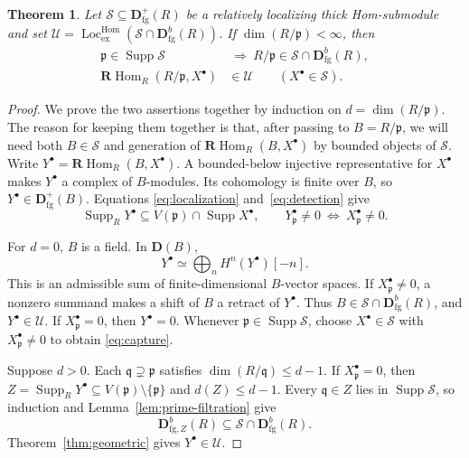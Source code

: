 \documentclass[11pt]{amsart}
\numberwithin{equation}{section}
\newtheorem{theorem}{Theorem}[section]
\theoremstyle{definition}
\theoremstyle{remark}
\DeclareMathOperator{\Supp}{Supp}
\DeclareMathOperator{\Loc}{Loc}
\DeclareMathOperator{\Hom}{Hom}
\newcommand{\RHom}{\mathbf R\!\Hom}
\newcommand{\D}{\mathbf D}
\newcommand{\fg}{\mathrm{fg}}
\newcommand{\Lhom}{\Loc_{\mathrm{ex}}^{\Hom}}
\newcommand{\p}{\mathfrak p}
\newcommand{\q}{\mathfrak q}
\begin{document}
\begin{theorem}\label{thm:coheight}
Let $\mathcal S\subseteq\D^+_{\fg}(R)$ be a relatively localizing thick
Hom-submodule and set
$\mathcal U=\Lhom(\mathcal S\cap\D^b_{\fg}(R))$. If $\dim(R/\p)<\infty$, then
\begin{align}
 \p\in\Supp\mathcal S&\ \Longrightarrow\ R/\p\in\mathcal S\cap\D^b_{\fg}(R),
 \label{eq:capture}\\
 \RHom_R(R/\p,X^{\bullet})&\in\mathcal U\qquad(X^{\bullet}\in\mathcal S).
 \label{eq:coinduce}
\end{align}
\end{theorem}
\begin{proof}
We prove the two assertions together by induction on
$d=\dim(R/\p)$. The reason for keeping them together is that, after
passing to $B=R/\p$, we will need both $B\in\mathcal S$ and generation
of $\RHom_R(B,X^{\bullet})$ by bounded objects of $\mathcal S$.
Write $Y^{\bullet}=\RHom_R(B,X^{\bullet})$. A bounded-below injective
representative for $X^{\bullet}$ makes $Y^{\bullet}$ a complex of $B$-modules. Its
cohomology is finite over $B$, so $Y^{\bullet}\in\D^+_{\fg}(B)$. Equations
\eqref{eq:localization} and~\eqref{eq:detection} give
\begin{equation}\label{eq:Ysupport}
 \Supp_R Y^{\bullet}\subseteq V(\p)\cap\Supp X^{\bullet},
 \qquad Y_\p^{\bullet}\ne0\ \Longleftrightarrow\ X_\p^{\bullet}\ne0.
\end{equation}

For $d=0$, $B$ is a field. In $\D(B)$,
\[
 Y^{\bullet}\simeq\bigoplus_nH^n(Y^{\bullet})[-n].
\]
This is an admissible sum of finite-dimensional $B$-vector spaces. If
$X_\p^{\bullet}\ne0$, a nonzero summand makes a shift of $B$ a retract of $Y^{\bullet}$.
Thus $B\in\mathcal S\cap\D^b_{\fg}(R)$, and $Y^{\bullet}\in\mathcal U$.
If $X_\p^{\bullet}=0$, then $Y^{\bullet}=0$. Whenever
$\p\in\Supp\mathcal S$, choose $X^{\bullet}\in\mathcal S$ with
$X_\p^{\bullet}\ne0$ to obtain \eqref{eq:capture}.

Suppose $d>0$. Each $\q\supsetneq\p$ satisfies
$\dim(R/\q)\leq d-1$. If $X_\p^{\bullet}=0$, then
$Z=\Supp_R Y^{\bullet}\subseteq V(\p)\setminus\{\p\}$ and $d(Z)\leq d-1$.
Every $\q\in Z$ lies in $\Supp\mathcal S$, so induction and
Lemma~\ref{lem:prime-filtration} give
\[
 \D^b_{\fg,Z}(R)\subseteq\mathcal S\cap\D^b_{\fg}(R).
\]
Theorem~\ref{thm:geometric} gives $Y^{\bullet}\in\mathcal U$.


\end{proof}
\end{document}
